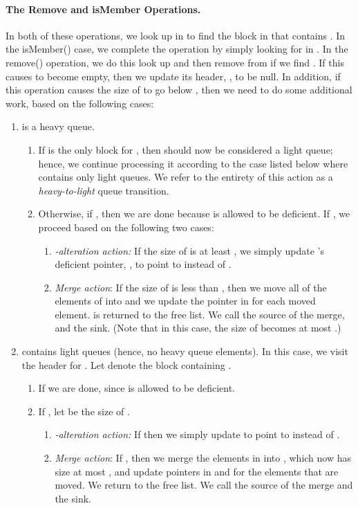 \documentclass[11pt,letterpaper]{article}
\begin{document}
\paragraph{The Remove and isMember Operations.}
In both of these operations, we look up  in  
to find the block  in  that
contains .
In the isMember() case, we complete the operation
by simply looking for  in .
In the
remove() operation, we do this look up and then remove  from 
if we find .
If this causes  to become empty, then we update its header, ,
to be null.
In addition, if this operation causes the size of  to go below , then
we need to do some additional work, based on the following cases:
\begin{enumerate}
\item
 is a heavy queue.
\begin{enumerate}
\item
If  is the only block for , then  should now be considered a light
queue; hence, we continue processing it according to the case listed
below where  contains only light queues. We refer to the entirety of this action
as a \emph{heavy-to-light} queue transition.
\item
Otherwise, if , then we are done because  is allowed to be deficient. 
If ,
we proceed based on the following two cases:
\begin{enumerate}
\item \emph{-alteration action:} If the size of  is at least , we simply update 's deficient pointer, , to point to  instead of .
\item \emph{Merge action}:
If the size of  is less than , then we move all 
of the elements of  into  and we update 
the pointer in  for each moved element.  is returned to the free list.
We call  the source of the merge, and  the sink.
(Note that in this case, the size of  becomes at most .)
\end{enumerate}
\end{enumerate}
\item
 contains light queues (hence, no heavy queue elements).  
In this case, we visit the header  for . 
Let  denote the block containing . 
\begin{enumerate} 
\item If  we are done,
since  is allowed to be deficient.
\item
If , let  be the size of . 
\begin{enumerate}
\item \emph{-alteration action:} If  then we simply update  to point to  instead of .
\item \emph{Merge action}:
If , then we merge the elements in  into , 
which now has size at most , and update pointers in
 and  for the elements that are moved. We return  to the free list. We call 
 the source of the merge and  the sink.
\end{enumerate}
\end{enumerate}
\end{enumerate}
\end{document}
